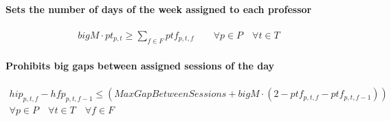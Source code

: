 \paragraph{Sets the number of days of the week assigned to each professor}
\begin{eqnarray}
bigM \cdot pt_{p,t} \ge \sum\limits_{f \in F} ptf_{p,t,f} \nonumber \qquad
\forall p \in P \quad
\forall t \in T \nonumber
\end{eqnarray}

\paragraph{Prohibits big gaps between assigned sessions of the day}
\begin{eqnarray}
hip_{p,t,f} - hfp_{p,t,f-1} \le (MaxGapBetweenSessions + bigM \cdot(2 - ptf_{p,t,f} - ptf_{p,t,f-1}))  \nonumber \qquad
\\
\forall p \in P \quad
\forall t \in T \quad
\forall f \in F \quad \nonumber
\end{eqnarray}



